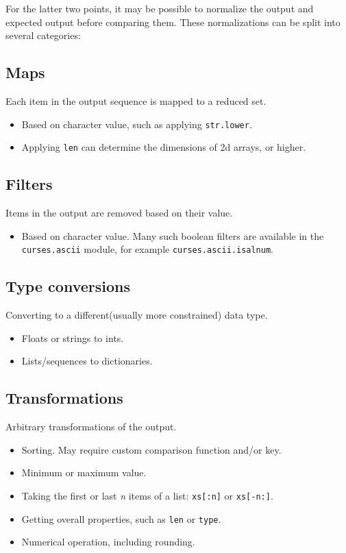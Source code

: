 For the latter two points, it may be possible to normalize the output and expected output before comparing them. These normalizations can be split into several categories:

\subsection{Maps}
Each item in the output sequence is mapped to a reduced set.
\begin{itemize}
\item Based on character value, such as applying \texttt{str.lower}.
\item Applying \texttt{len} can determine the dimensions of 2d arrays, or higher.
\end{itemize}

\subsection{Filters}
Items in the output are removed based on their value.
\begin{itemize}
\item Based on character value. Many such boolean filters are available in the \texttt{curses.ascii} module, for example \texttt{curses.ascii.isalnum}.
\end{itemize}

\subsection{Type conversions}
Converting to a different(usually more constrained) data type.
\begin{itemize}
\item Floats or strings to ints.
\item Lists/sequences to dictionaries.
\end{itemize}

\subsection{Transformations}
Arbitrary transformations of the output.
\begin{itemize}
\item Sorting. May require custom comparison function and/or key.
\item Minimum or maximum value.
\item Taking the first or last \textit{n} items of a list: \texttt{xs[:n]} or \texttt{xs[-n:]}.
\item Getting overall properties, such as \texttt{len} or \texttt{type}.
\item Numerical operation, including rounding.
\end{itemize}

